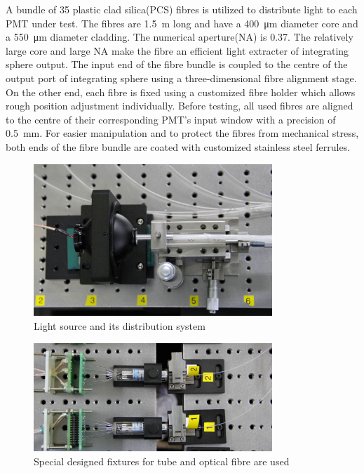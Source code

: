 \documentclass[5p, times]{elsarticle}
\begin{document}
A bundle of 35 plastic clad silica(PCS) fibres is utilized to distribute light to each PMT under test.
The fibres are \SI{1.5}{\meter} long and have a \SI{400}{\micro\meter} diameter core and a \SI{550}{\micro\meter} diameter cladding.
The numerical aperture(NA) is 0.37.
The relatively large core and large NA make the fibre an efficient light extracter of integrating sphere output. 
The input end of the fibre bundle is coupled to the centre of the output port of integrating sphere using a three-dimensional fibre alignment stage.
On the other end, each fibre is fixed using a customized fibre holder which allows rough position adjustment individually.
Before testing, all used fibres are aligned to the centre of their corresponding PMT's input window with a precision of \SI{0.5}{\milli\meter}.  
For easier manipulation and to protect the fibres from mechanical stress, both ends of the fibre bundle are coated with customized stainless steel ferrules.

\begin{figure}[h!]
 \centering
 \includegraphics[width=90mm]{light_source1_crop}
\caption{Light source and its distribution system}
\label{fig:light_source}
\end{figure} 

\begin{figure}[h!]
 \centering
 \includegraphics[width=90mm]{fixtures1_crop}
\caption{Special designed fixtures for tube and optical fibre are used}
\label{fig:fixture}
\end{figure}
\end{document}
